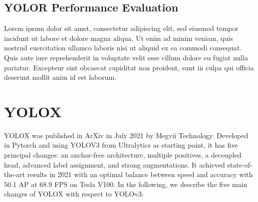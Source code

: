 \documentclass{article}
\begin{document}
\subsection{YOLOR Performance Evaluation}


Lorem ipsum dolor sit amet, consectetur adipiscing elit, sed eiusmod tempor incidunt ut labore et dolore magna aliqua. Ut enim ad minim veniam, quis nostrud exercitation ullamco laboris nisi ut aliquid ex ea commodi consequat. Quis aute iure reprehenderit in voluptate velit esse cillum dolore eu fugiat nulla pariatur. Excepteur sint obcaecat cupiditat non proident, sunt in culpa qui officia deserunt mollit anim id est laborum.



\section{YOLOX}



YOLOX \cite{ge2021yolox} was published in ArXiv in July 2021 by Megvii Technology. Developed in Pytorch and using YOLOV3 from Ultralytics as starting point, it has five principal changes: an anchor-free architecture, multiple positives, a decoupled head, advanced label assignment, and strong augmentations. It achieved state-of-the-art results in 2021 with an optimal balance between speed and accuracy with 50.1 AP at 68.9 FPS on Tesla V100. In the following, we describe the five main changes of YOLOX with respect to YOLOv3:
\end{document}
